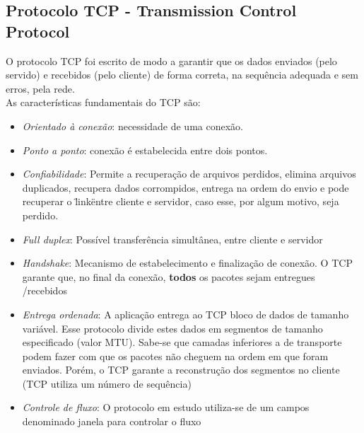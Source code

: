 \documentclass[a4paper,10pt]{article}
\begin{document}
\subsection{Protocolo TCP - Transmission Control Protocol}
O protocolo TCP foi escrito de modo a garantir que os dados enviados (pelo
servido) e recebidos (pelo cliente) de forma correta, na sequência 
adequada e sem erros, pela rede.
\\As características fundamentais do TCP são:
\begin{itemize}
\item \emph{Orientado à conexão}: necessidade de uma conexão.
\item \emph{Ponto a ponto}: conexão é estabelecida entre dois pontos.
\item \emph{Confiabilidade}: Permite a recuperação de arquivos perdidos, elimina 
arquivos duplicados, recupera dados corrompidos, entrega na ordem do envio e 
pode recuperar o \"link\" entre cliente e servidor, caso esse, por algum motivo,
seja perdido.
\item \emph{Full duplex}: Possível transferência simultânea, entre cliente e 
servidor
\item \emph{Handshake}: Mecanismo de estabelecimento e finalização de conexão.
O TCP garante que, no final da conexão, \textbf{todos} os pacotes sejam entregues
/recebidos
\item \emph{Entrega ordenada}: A aplicação entrega ao TCP bloco de dados de 
tamanho variável. Esse protocolo divide estes dados em segmentos de tamanho 
especificado (valor MTU). Sabe-se que camadas inferiores a de transporte podem 
fazer com que os pacotes não cheguem na ordem em que foram enviados. Porém, o TCP
garante a reconstrução dos segmentos no cliente (TCP utiliza um número de 
sequência)
\item \emph{Controle de fluxo}: O protocolo em estudo utiliza-se de um campos 
denominado janela para controlar o fluxo
\end{itemize}
\end{document}
